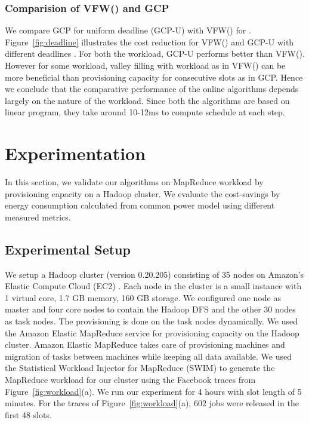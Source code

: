 \documentclass[10pt,conference,compsocconf,letterpaper]{IEEEtran}
\begin{document}
\subsubsection*{Comparision of VFW() and GCP}
We compare GCP for uniform deadline (GCP-U) with VFW() for . Figure~\ref{fig:deadline} illustrates the cost reduction for VFW() and GCP-U with different deadlines . For both the workload, GCP-U performs better than VFW(). However for some workload, valley filling with workload as in VFW() can be more beneficial than provisioning capacity for  consecutive slots as in GCP. Hence we conclude that the comparative performance of the online algorithms depends largely on the nature of the workload. Since both the algorithms are based on linear program, they take around 10-12ms to compute schedule at each step.















\section{Experimentation}
In this section, we validate our algorithms on MapReduce workload by provisioning capacity on a Hadoop cluster. We evaluate the cost-savings by energy consumption calculated from common power model using different measured metrics.

\subsection{Experimental Setup}
We setup a Hadoop cluster (version 0.20.205) consisting of 35 nodes on Amazon's Elastic Compute Cloud (EC2) \cite{n1,n2}. Each node in the cluster is a small instance with 1 virtual core, 1.7 GB memory, 160 GB storage. We configured one node as master and four core nodes to contain the Hadoop DFS and the other 30 nodes as task nodes. The provisioning is done on the task nodes dynamically. We used the Amazon Elastic MapReduce service for provisioning capacity on the Hadoop cluster. Amazon Elastic MapReduce takes care of provisioning machines and migration of tasks between machines while keeping all data available. We used the Statistical Workload Injector for MapReduce (SWIM) \cite{n4} to generate the MapReduce workload for our cluster using the Facebook traces from Figure~\ref{fig:workload}(a). We run our experiment for 4 hours with slot length of 5 minutes. For the traces of Figure~\ref{fig:workload}(a), 602 jobs were released in the first 48 slots.
\end{document}
